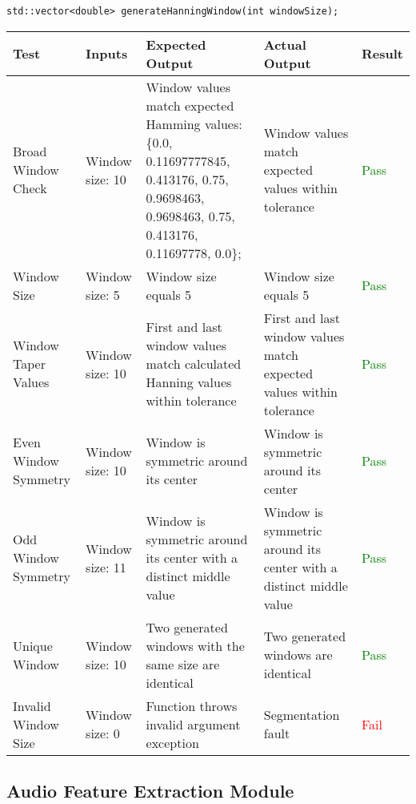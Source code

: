\documentclass[12pt, titlepage]{article}
\begin{document}
\noindent\texttt{std::vector<double> generateHanningWindow(int windowSize);}\\
\begin{longtable}{|L{3cm}|L{3cm}|L{2.5cm}|L{2.5cm}|l|}
  \hline
  \textbf{Test} & \textbf{Inputs} & \textbf{Expected Output} & \textbf{Actual Output} & \textbf{Result} \\
  \hline
  Broad Window Check &
    Window size: 10 &
    Window values match expected Hamming values: \{0.0, 0.11697777845, 0.413176, 0.75, 0.9698463, 
    0.9698463, 0.75, 0.413176, 0.11697778, 0.0\}; &
    Window values match expected values within tolerance &
    \textcolor{green}{Pass} \\
  \hline
  Window Size &
    Window size: 5 &
    Window size equals 5 &
    Window size equals 5 &
    \textcolor{green}{Pass} \\
  \hline
  Window Taper Values &
    Window size: 10 &
    First and last window values match calculated Hanning values within tolerance &
    First and last window values match expected values within tolerance &
    \textcolor{green}{Pass} \\
  \hline
  Even Window Symmetry &
    Window size: 10 &
    Window is symmetric around its center &
    Window is symmetric around its center &
    \textcolor{green}{Pass} \\
  \hline
  Odd Window Symmetry &
    Window size: 11 &
    Window is symmetric around its center with a distinct middle value &
    Window is symmetric around its center with a distinct middle value &
    \textcolor{green}{Pass} \\
  \hline
  Unique Window &
    Window size: 10 &
    Two generated windows with the same size are identical &
    Two generated windows are identical &
    \textcolor{green}{Pass} \\
  \hline
  Invalid Window Size &
    Window size: 0 &
    Function throws invalid argument exception &
    Segmentation fault &
    \textcolor{red}{Fail} \\
  \hline
\end{longtable}

\subsection{Audio Feature Extraction Module}
\end{document}
